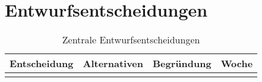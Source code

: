\chapter{Entwurfsentscheidungen}



\begin{table}[h!]
	\centering
	\begin{tabular}{p{3cm}|p{4cm}| p{5.5cm} | p{1.5cm}|}
		\hline
		\textbf{Entscheidung} & \textbf{Alternativen} & \textbf{Begründung} & \textbf{Woche}\\
		\hline
		
		&  & & \\
		\hline
	\end{tabular}
	\caption{Zentrale Entwurfsentscheidungen}
	\label{tab:entwurfsentschiedungen}
\end{table}

